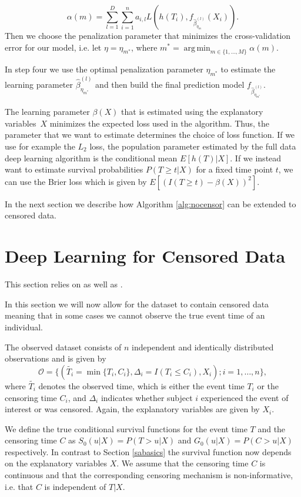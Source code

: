 \documentclass[12pt, a4paper]{scrartcl}
\theoremstyle{definition}
\theoremstyle{plain}
\numberwithin{equation}{section}
\numberwithin{figure}{section}
\numberwithin{table}{section}
\DeclareMathOperator*{\argmin}{arg\,min}
\begin{document}
	\begin{equation*}
	 \alpha(m) = \sum_{l=1}^D \sum_{i=1}^n a_{i,l} L(h(T_i), f_{\hat{\beta}_{\eta_m}^{(l)}}(X_i)).
 	\end{equation*}
 	Then we choose the penalization parameter that minimizes the cross-validation error for our model, i.e. let $\eta = \eta_{m^*}$, where $m^* = \argmin_{m \in \{1,\dots,M\}} \alpha(m)$.
 	
 	In step four we use the optimal penalization parameter $\eta_{m^*}$ to estimate the learning parameter $\hat{\beta}_{\eta_{m^*}}^{(l)}$ and then build the final prediction model $f_{\hat{\beta}_{\eta_{m^*}}^{(l)}}$.
 	
 	The learning parameter $\beta(X)$ that is estimated using the explanatory variables~$X$ minimizes the expected loss used in the algorithm.
 	Thus, the parameter that we want to estimate determines the choice of loss function.
 	If we use for example the $L_2$ loss, the population parameter estimated by the full data deep learning algorithm is the conditional mean $E[h(T) \vert X]$.
 	If we instead want to estimate survival probabilities $P(T\geq t \vert X )$ for a fixed time point $t$, we can use the Brier loss which is given by $E[(I(T\geq t)-\beta(X))^2]$.
 	
 	In the next section we describe how Algorithm \ref{alg:nocensor} can be extended to censored data.
 	
	\newpage
	\section{Deep Learning for Censored Data} \label{censored}
	
	This section relies on \citet*{basearticle} as well as \citet*{deeplbook}.
	
	In this section we will now allow for the dataset to contain censored data meaning that in some cases we cannot observe the true event time of an individual.
	
	The observed dataset consists of $n$ independent and identically distributed observations and is given by
	$$\mathcal{O} = \{(\tilde{T_i} = \min \{T_i, C_i\}, \Delta_i = I(T_i \leq C_i), X_i); i = 1,\dots,n\},$$
	 where $\tilde{T_i}$ denotes the observed time, which is either the event time $T_i$ or the censoring time $C_i$, and $\Delta_i$ indicates whether subject $i$ experienced the event of interest or was censored.
	 Again, the explanatory variables are given by $X_i$.
	 
	 We define the true conditional survival functions for the event time $T$ and the censoring time $C$ as $S_0(u \vert X)=P(T>u \vert X)$ and $G_0(u \vert X)=P(C>u \vert X)$ respectively.
	 In contrast to Section \ref{sabasics} the survival function now depends on the explanatory variables $X$.
	 We assume that the censoring time $C$ is continuous and that the corresponding censoring mechanism is non-informative, i.e. that $C$ is independent of $T\vert X$.
	 
\end{document}
